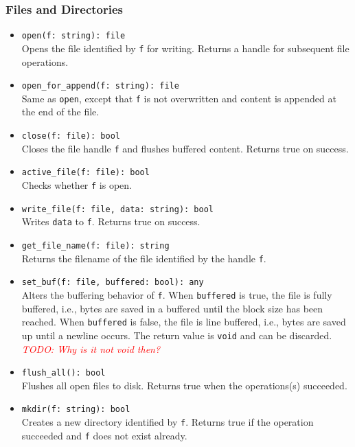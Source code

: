 \documentclass[10pt,landscape]{article}
\def\todo#1{\textit{\textcolor{red}{TODO: #1}}}
\begin{document}
\begin{multicols*}{2}
\subsubsection*{Files and Directories}

\begin{itemize}
  \item \verb|open(f: string): file|\\
    Opens the file identified by \texttt{f} for writing. Returns a handle
    for subsequent file operations.
  \item \verb|open_for_append(f: string): file|\\
    Same as \texttt{open}, except that \texttt{f} is not overwritten and
    content is appended at the end of the file.
  \item \verb|close(f: file): bool|\\
    Closes the file handle \texttt{f} and flushes buffered content. Returns
    true on success.
  \item \verb|active_file(f: file): bool|\\
    Checks whether \texttt{f} is open.
  \item \verb|write_file(f: file, data: string): bool|\\
    Writes \texttt{data} to \texttt{f}. Returns true on success.
  \item \verb|get_file_name(f: file): string|\\
    Returns the filename of the file identified by the handle \texttt{f}.
  \item \verb|set_buf(f: file, buffered: bool): any|\\
    Alters the buffering behavior of \texttt{f}. When \texttt{buffered} is
    true, the file is fully buffered, i.e., bytes are saved in a buffered until
    the block size has been reached. When \texttt{buffered} is false, the file
    is line buffered, i.e., bytes are saved up until a newline occurs. The
    return value is \texttt{void} and can be discarded.
    \todo{Why is it not void then?}
  \item \verb|flush_all(): bool|\\
    Flushes all open files to disk.
    Returns true when the operations(s) succeeded.
  \item \verb|mkdir(f: string): bool|\\
    Creates a new directory identified by \texttt{f}. Returns true if the
    operation succeeded and \texttt{f} does not exist already.
\end{itemize}


\end{multicols*}
\end{document}
